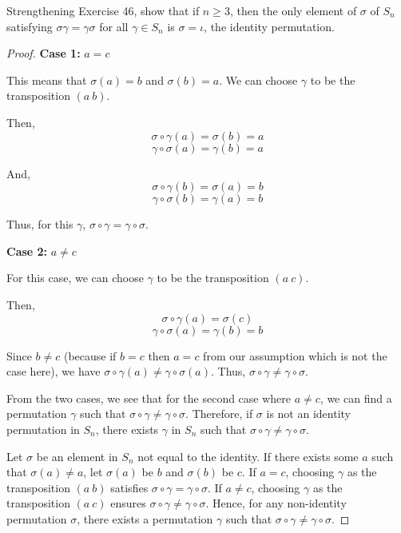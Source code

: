 \documentclass[12pt]{amsart}
\theoremstyle{definition}
\numberwithin{equation}{section}
\theoremstyle{plain}
\begin{document}
\begin{exercise}{47} Strengthening Exercise 46, show that if $n \geq 3$, then the only element of $\sigma$ of $S_n$ satisfying $\sigma\gamma = \gamma\sigma$ for all
    $\gamma \in S_n$ is $\sigma = \iota$, the identity permutation.

    \begin{proof}
\textbf{Case 1:} \( a = c \)

This means that \( \sigma(a) = b \) and \( \sigma(b) = a \). We can choose \( \gamma \) to be the transposition \( (a \ b) \). 

Then, 
\[ \sigma \circ \gamma(a) = \sigma(b) = a \]
\[ \gamma \circ \sigma(a) = \gamma(b) = a \]

And,
\[ \sigma \circ \gamma(b) = \sigma(a) = b \]
\[ \gamma \circ \sigma(b) = \gamma(a) = b \]

Thus, for this \( \gamma \), \( \sigma \circ \gamma = \gamma \circ \sigma \).

\textbf{Case 2:} \( a \neq c \)

For this case, we can choose \( \gamma \) to be the transposition \( (a \ c) \).

Then,
\[ \sigma \circ \gamma(a) = \sigma(c) \]
\[ \gamma \circ \sigma(a) = \gamma(b) = b \]

Since \( b \neq c \) (because if \( b = c \) then \( a = c \) from our assumption which is not the case here), we have \( \sigma \circ \gamma(a) \neq \gamma \circ \sigma(a) \). Thus, \( \sigma \circ \gamma \neq \gamma \circ \sigma \).

From the two cases, we see that for the second case where \( a \neq c \), we can find a permutation \( \gamma \) such that \( \sigma \circ \gamma \neq \gamma \circ \sigma \). Therefore, if \( \sigma \) is not an identity permutation in \( S_n \), there exists \( \gamma \) in \( S_n \) such that \( \sigma \circ \gamma \neq \gamma \circ \sigma \).

Let \( \sigma \) be an element in \( S_n \) not equal to the identity. If there exists some \( a \) such that \( \sigma(a) \neq a \), let \( \sigma(a) \) be \( b \) and \( \sigma(b) \) be \( c \). If \( a = c \), choosing \( \gamma \) as the transposition \( (a \ b) \) satisfies \( \sigma \circ \gamma = \gamma \circ \sigma \). If \( a \neq c \), choosing \( \gamma \) as the transposition \( (a \ c) \) ensures \( \sigma \circ \gamma \neq \gamma \circ \sigma \). Hence, for any non-identity permutation \( \sigma \), there exists a permutation \( \gamma \) such that \( \sigma \circ \gamma \neq \gamma \circ \sigma \).
\end{proof}
\end{exercise}
\end{document}
